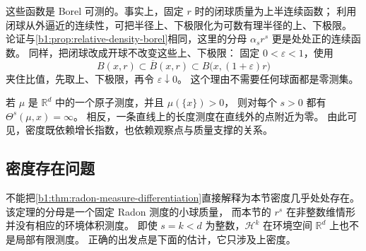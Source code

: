 这些函数是 Borel 可测的。事实上，固定 \(r\) 时的闭球质量为上半连续函数；
利用闭球从外逼近的连续性，可把半径上、下极限化为可数有理半径的上、下极限。
论证与\cref{b1:prop:relative-density-borel}相同，这里的分母
\(\alpha_s r^s\) 更是处处正的连续函数。
同样，把闭球改成开球不改变这些上、下极限：
固定 \(0<\varepsilon<1\)，使用
\[
 B(x,r)\subset\overline B(x,r)\subset B\bigl(x,(1+\varepsilon)r\bigr)
\]
夹住比值，先取上、下极限，再令 \(\varepsilon\downarrow0\)。
这个理由不需要任何球面都是零测集。

\ProseParagraphBreak

若 \(\mu\) 是 \(\mathbb R^d\) 中的一个原子测度，并且 \(\mu(\{x\})>0\)，
则对每个 \(s>0\) 都有 \(\Theta^s(\mu,x)=\infty\)。
相反，一条直线上的长度测度在直线外的点附近为零。
由此可见，密度既依赖增长指数，也依赖观察点与质量支撑的关系。

\subsection{密度存在问题}
\label{b1:subsec:150502}

不能把\cref{b1:thm:radon-measure-differentiation}直接解释为本节密度几乎处处存在。
该定理的分母是一个固定 Radon 测度的小球质量，
而本节的 \(r^s\) 在非整数维情形并没有相应的环境体积测度。
即使 \(s=k<d\) 为整数，\(\mathcal H^k\) 在环境空间 \(\mathbb R^d\) 上也不是局部有限测度。
正确的出发点是下面的估计，它只涉及上密度。

